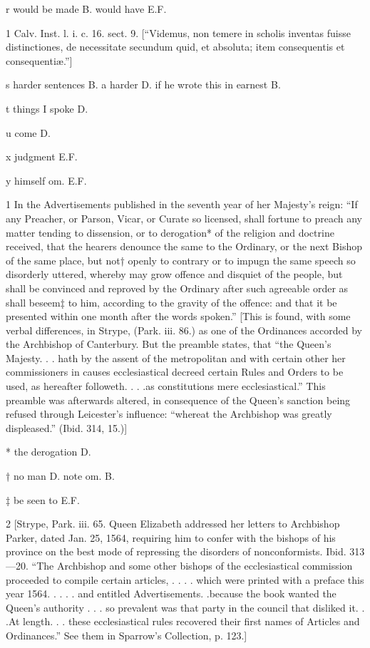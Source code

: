 r
would be made B. would have E.F.

1
Calv. Inst. l. i. c. 16. sect. 9. [“Videmus, non temere in scholis inventas fuisse distinctiones, de necessitate secundum quid, et absoluta; item consequentis et consequentiæ.”]

s
harder sentences B. a harder D. if he wrote this in earnest B.

t
things I spoke D.

u
come D.

x
judgment E.F.

y
himself om. E.F.

1
In the Advertisements published in the seventh year of her Majesty’s reign: “If any Preacher, or Parson, Vicar, or Curate so licensed, shall fortune to preach any matter tending to dissension, or to derogation* of the religion and doctrine received, that the hearers denounce the same to the Ordinary, or the next Bishop of the same place, but not† openly to contrary or to impugn the same speech so disorderly uttered, whereby may grow offence and disquiet of the people, but shall be convinced and reproved by the Ordinary after such agreeable order as shall beseem‡ to him, according to the gravity of the offence: and that it be presented within one month after the words spoken.” [This is found, with some verbal differences, in Strype, (Park. iii. 86.) as one of the Ordinances accorded by the Archbishop of Canterbury. But the preamble states, that “the Queen’s Majesty. . . hath by the assent of the metropolitan and with certain other her commissioners in causes ecclesiastical decreed certain Rules and Orders to be used, as hereafter followeth. . . .as constitutions mere ecclesiastical.” This preamble was afterwards altered, in consequence of the Queen’s sanction being refused through Leicester’s influence: “whereat the Archbishop was greatly displeased.” (Ibid. 314, 15.)]

*
the derogation D.

†
no man D. note om. B.

‡
be seen to E.F.

2
[Strype, Park. iii. 65. Queen Elizabeth addressed her letters to Archbishop Parker, dated Jan. 25, 1564, requiring him to confer with the bishops of his province on the best mode of repressing the disorders of nonconformists. Ibid. 313—20. “The Archbishop and some other bishops of the ecclesiastical commission proceeded to compile certain articles, . . . . which were printed with a preface this year 1564. . . . . and entitled Advertisements. .because the book wanted the Queen’s authority . . . so prevalent was that party in the council that disliked it. . .At length. . . these ecclesiastical rules recovered their first names of Articles and Ordinances.” See them in Sparrow’s Collection, p. 123.]

